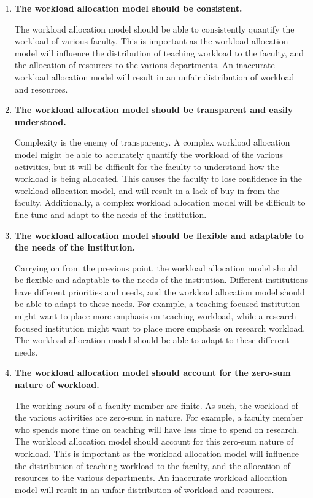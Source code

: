 \begin{enumerate}

  \item \textbf{The workload allocation model should be consistent.}

        The workload allocation model should be able to consistently quantify the workload of various faculty. This is important as the workload allocation model will influence the distribution of teaching workload to the faculty, and the allocation of resources to the various departments. An inaccurate workload allocation model will result in an unfair distribution of workload and resources.

  \item \textbf{The workload allocation model should be transparent and easily understood.}

        Complexity is the enemy of transparency. A complex workload allocation model might be able to accurately quantify the workload of the various activities, but it will be difficult for the faculty to understand how the workload is being allocated. This causes the faculty to lose confidence in the workload allocation model, and will result in a lack of buy-in from the faculty. Additionally, a complex workload allocation model will be difficult to fine-tune and adapt to the needs of the institution.

  \item \textbf{The workload allocation model should be flexible and adaptable to the needs of the institution.}

        Carrying on from the previous point, the workload allocation model should be flexible and adaptable to the needs of the institution. Different institutions have different priorities and needs, and the workload allocation model should be able to adapt to these needs. For example, a teaching-focused institution might want to place more emphasis on teaching workload, while a research-focused institution might want to place more emphasis on research workload. The workload allocation model should be able to adapt to these different needs.

  \item \textbf{The workload allocation model should account for the zero-sum nature of workload.}

        The working hours of a faculty member are finite. As such, the workload of the various activities are zero-sum in nature. For example, a faculty member who spends more time on teaching will have less time to spend on research. The workload allocation model should account for this zero-sum nature of workload. This is important as the workload allocation model will influence the distribution of teaching workload to the faculty, and the allocation of resources to the various departments. An inaccurate workload allocation model will result in an unfair distribution of workload and resources.


\end{enumerate}
